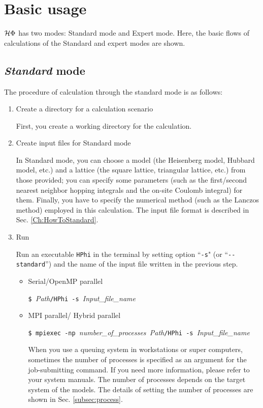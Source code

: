 \section{Basic usage}
$\mathcal{H} \Phi$ has two modes: Standard mode and Expert mode.
Here, the basic flows of calculations of the Standard and expert modes are shown.

\subsection{{\it Standard} mode}

The procedure of calculation through the standard mode is as follows:

\begin{enumerate}

\item Create a directory for a calculation scenario

First, you create a working directory for the calculation.

\item Create input files for Standard mode

In Standard mode, you can choose a model (the Heisenberg model, Hubbard model, etc.) and 
a lattice (the square lattice, triangular lattice, etc.) from those provided;
you can specify some parameters
(such as the first/second nearest neighbor hopping integrals and
the on-site Coulomb integral) for them.
Finally, you have to specify the numerical method (such as the Lanczos method) employed in this calculation.
The input file format is described in Sec. \ref{Ch:HowToStandard}.

\item  Run

  Run an executable \verb|HPhi| in the terminal by setting option ``\verb|-s|"
  (or ``\verb|--standard|'') and the name of the input file written in the previous step.

\begin{itemize}

\item Serial/OpenMP parallel

  \verb|$ |\textit{Path}\verb|/HPhi -s |\textit{Input\_file\_name}

\item MPI parallel/ Hybrid parallel

  \verb|$ mpiexec -np |\textit{number\_of\_processes}\verb| |\textit{Path}\verb|/HPhi -s |\textit{Input\_file\_name}

  When you use a queuing system in workstations or super computers, 
  sometimes the number of processes is specified as an argument for the job-submitting command.
  If you need more information, please refer to your system manuals. 
  The number of processes depends on the target system of the models.
  The details of setting the number of processes are shown in Sec. \ref{subsec:process}.
\end{itemize}


\end{enumerate}
